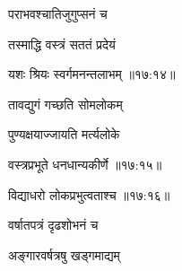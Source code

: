 \nemslokab

{\devanagarifontbold पराभवश्चातिजुगुप्सनं च  \danda\dontdisplaylinenum }%

\nemslokac

{\devanagarifontbold तस्माद्धि वस्त्रं सततं प्रदेयं }%
  \dontdisplaylinenum

\nemslokad

{\devanagarifontbold यशः श्रियः स्वर्गमनन्तलाभम् {॥१७:१४॥} \veg\dontdisplaylinenum }%

\ujvers{}

\nemslokab

{\devanagarifontbold तावद्युगं गच्छति सोमलोकम्  \danda\dontdisplaylinenum }%

\nemslokac

{\devanagarifontbold पुण्यक्षयाज्जायति मर्त्यलोके }%
  \dontdisplaylinenum    {}%


\nemslokad

{\devanagarifontbold वस्त्रप्रभूते धनधान्यकीर्णे {॥१७:१५॥} \veg\dontdisplaylinenum }%

\ujvers{}

\nemslokad

{\devanagarifontbold विद्याधरो लोकप्रभुत्वताश्च {॥१७:१६॥} \veg\dontdisplaylinenum }%
 
\ujvers{}

\nemslokab

{\devanagarifontbold वर्षातपत्रं दृढशोभनं च  \danda\dontdisplaylinenum }%
 
\nemslokac

{\devanagarifontbold अङ्गारवर्षत्रषु खड्गमाद्यम् }%
  \dontdisplaylinenum

\nemslokad

